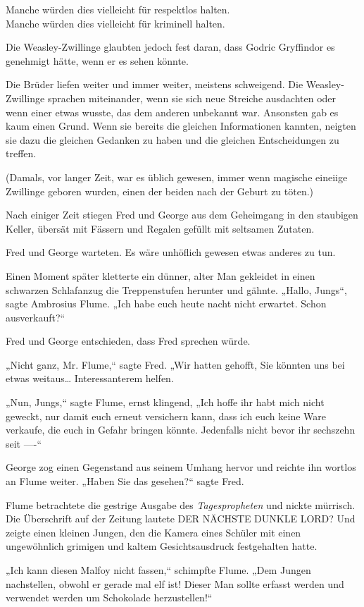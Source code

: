 {Manche würden dies vielleicht für respektlos halten.\\ Manche würden dies vielleicht für kriminell halten.

Die Weasley-Zwillinge glaubten jedoch fest daran, dass Godric Gryffindor es genehmigt hätte, wenn er es sehen könnte.

Die Brüder liefen weiter und immer weiter, meistens schweigend. Die Weasley-Zwillinge sprachen miteinander, wenn sie sich neue Streiche ausdachten oder wenn einer etwas wusste, das dem anderen unbekannt war. Ansonsten gab es kaum einen Grund. Wenn sie bereits die gleichen Informationen kannten, neigten sie dazu die gleichen Gedanken zu haben und die gleichen Entscheidungen zu treffen.

(Damals, vor langer Zeit, war es üblich gewesen, immer wenn magische eineiige Zwillinge geboren wurden, einen der beiden nach der Geburt zu töten.)

Nach einiger Zeit stiegen Fred und George aus dem Geheimgang in den staubigen Keller, übersät mit Fässern und Regalen gefüllt mit seltsamen Zutaten.

Fred und George warteten. Es wäre unhöflich gewesen etwas anderes zu tun.

Einen Moment später kletterte ein dünner, alter Man gekleidet in einen schwarzen Schlafanzug die Treppenstufen herunter und gähnte. „Hallo, Jungs“, sagte Ambrosius Flume. „Ich habe euch heute nacht nicht erwartet. Schon ausverkauft?“

Fred und George entschieden, dass Fred sprechen würde.

„Nicht ganz, Mr. Flume,“ sagte Fred. „Wir hatten gehofft, Sie könnten uns bei etwas weitaus… Interessanterem helfen.

„Nun, Jungs,“ sagte Flume, ernst klingend, „Ich hoffe ihr habt mich nicht geweckt, nur damit euch erneut versichern kann, dass ich euch keine Ware verkaufe, die euch in Gefahr bringen könnte. Jedenfalls nicht bevor ihr sechszehn seit ----“

George zog einen Gegenstand aus seinem Umhang hervor und reichte ihn wortlos an Flume weiter. „Haben Sie das gesehen?“ sagte Fred.

Flume betrachtete die gestrige Ausgabe des \emph{Tagespropheten} und nickte mürrisch. Die Überschrift auf der Zeitung lautete DER NÄCHSTE DUNKLE LORD? Und zeigte einen kleinen Jungen, den die Kamera eines Schüler mit einen ungewöhnlich grimigen und kaltem Gesichtsausdruck festgehalten hatte.

„Ich kann diesen Malfoy nicht fassen,“ schimpfte Flume. „Dem Jungen nachstellen, obwohl er gerade mal elf ist! Dieser Man sollte erfasst werden und verwendet werden um Schokolade herzustellen!“

}
